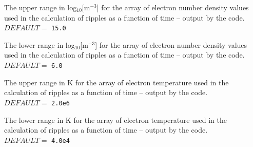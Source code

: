 \documentclass[12pt,a4paper]{article}
\begin{document}
  \vspace{0.5cm}

  \setlength{\temptextwidth}{\textwidth} 
  \addtolength{\temptextwidth}{-1.0\parindent} 
    
    \parbox[t]{\temptextwidth}{The upper range in log$_{10}$[m$^{-3}$] for the 
                               array of electron number density values used in 
                               the calculation of ripples as a function of 
                               time -- output by the  code. \\ 
                               $DEFAULT=$ {\tt 15.0}}

  \vspace{0.5cm}

  \setlength{\temptextwidth}{\textwidth} 
  \addtolength{\temptextwidth}{-1.0\parindent} 
    
    \parbox[t]{\temptextwidth}{The lower range in log$_{10}$[m$^{-3}$] for the 
                               array of electron number density values used in 
                               the calculation of ripples as a function of 
                               time -- output by the  code. \\ 
                               $DEFAULT=$ {\tt 6.0}}

  \vspace{0.5cm}

  \setlength{\temptextwidth}{\textwidth} 
  \addtolength{\temptextwidth}{-1.0\parindent} 
   
    \parbox[t]{\temptextwidth}{The upper range in K for the array of electron 
                               temperature used in the calculation of ripples 
                               as a function of time -- output by the  code. \\ 
                               $DEFAULT=$ {\tt 2.0e6}} 

  \vspace{0.5cm}

  \setlength{\temptextwidth}{\textwidth}  
  \addtolength{\temptextwidth}{-1.0\parindent} 
    
    \parbox[t]{\temptextwidth}{The lower range in K for the array of electron 
                               temperature used in the calculation of ripples 
                               as a function of time -- output by the  code. \\ 
                               $DEFAULT=$ {\tt 4.0e4}}
\end{document}

